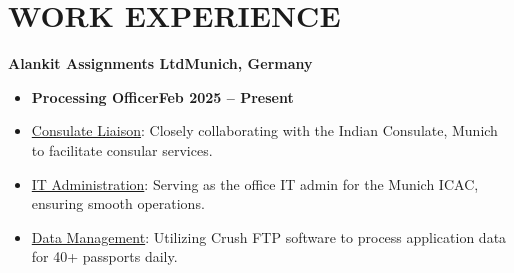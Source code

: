 \documentclass[11pt,a4paper]{article}
\newenvironment{dashlist}{
  \begin{itemize}[label={--}]
}{
  \end{itemize}
}
\begin{document}
\section*{WORK EXPERIENCE}
\noindent\textbf{Alankit Assignments Ltd\hfill Munich, Germany}
\begin{itemize}
\item \textbf{Processing Officer\hfill Feb 2025 – Present}
\end{itemize}
\begin{dashlist}
  \item \uline {Consulate Liaison}: Closely collaborating with the Indian Consulate, Munich to facilitate consular services.
  \item \uline {IT Administration}: Serving as the office IT admin for the Munich ICAC, ensuring smooth operations.
  \item \uline {Data Management}: Utilizing Crush FTP software to process application data for 40+ passports daily.
\end{dashlist}

\medskip
\end{document}
